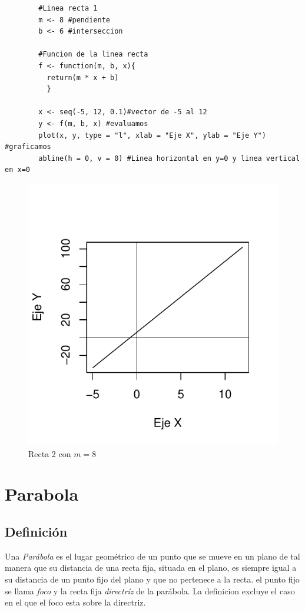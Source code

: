 \documentclass[12pt,a4paper]{article}
\begin{document}
\begin{table}[htpb]
	\begin{lstlisting}
		#Linea recta 1
		m <- 8 #pendiente
		b <- 6 #interseccion
		
		#Funcion de la linea recta
		f <- function(m, b, x){
		  return(m * x + b)
		  }
		
		x <- seq(-5, 12, 0.1)#vector de -5 al 12
		y <- f(m, b, x) #evaluamos
		plot(x, y, type = "l", xlab = "Eje X", ylab = "Eje Y") #graficamos
		abline(h = 0, v = 0) #Linea horizontal en y=0 y linea vertical en x=0
	\end{lstlisting}
	\caption{Segundo código en R para gráficar la recta de la figura \ref{fig:recta2}.}
	\label{alg:recta2}
\end{table}
\begin{figure}
\centering
\includegraphics[scale=.8]{LR2}
\caption{Recta 2 con $ m = 8 $}
\label{fig:recta2}
\end{figure}

\section{Parabola} \label{sec:Parabola}

\subsection{Definici\'{o}n} \label{subsec:DefP}
Una \emph{Parábola} es el lugar geométrico de un punto que se mueve en un plano de tal manera que su distancia de una recta fija, situada en el plano, es siempre igual a su distancia de un punto fijo del plano y que no pertenece a la recta. el punto fijo se llama \emph{foco} y la recta fija \emph{directríz} de la parábola. La definicion excluye el caso en el que el foco esta sobre la directriz.\cite{geometria}\\ \\
\end{document}
